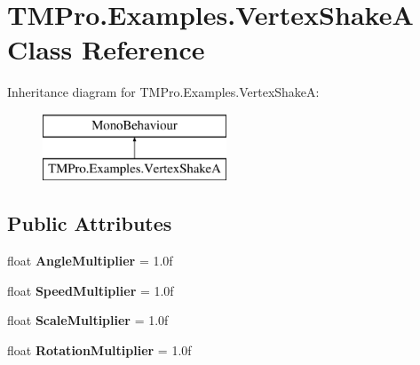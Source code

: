 \hypertarget{class_t_m_pro_1_1_examples_1_1_vertex_shake_a}{}\section{T\+M\+Pro.\+Examples.\+Vertex\+ShakeA Class Reference}
\label{class_t_m_pro_1_1_examples_1_1_vertex_shake_a}
Inheritance diagram for T\+M\+Pro.\+Examples.\+Vertex\+ShakeA\+:\begin{figure}[H]
\begin{center}
\leavevmode
\includegraphics[height=2.000000cm]{class_t_m_pro_1_1_examples_1_1_vertex_shake_a}
\end{center}
\end{figure}
\subsection*{Public Attributes}
\begin{DoxyCompactItemize}
\item 
\mbox{\label{class_t_m_pro_1_1_examples_1_1_vertex_shake_a_a8a3fca222f496902c262c53683d3f94e}} 
float {\bfseries Angle\+Multiplier} = 1.\+0f
\item 
\mbox{\label{class_t_m_pro_1_1_examples_1_1_vertex_shake_a_a10bf945b918292c2ea7552dd86f6a4ec}} 
float {\bfseries Speed\+Multiplier} = 1.\+0f
\item 
\mbox{\label{class_t_m_pro_1_1_examples_1_1_vertex_shake_a_a9e03d577c862b3b95e7309143c0a1d74}} 
float {\bfseries Scale\+Multiplier} = 1.\+0f
\item 
\mbox{\label{class_t_m_pro_1_1_examples_1_1_vertex_shake_a_ab4bd4cb50926999b1a1ac59da8fcf7f1}} 
float {\bfseries Rotation\+Multiplier} = 1.\+0f
\end{DoxyCompactItemize}
